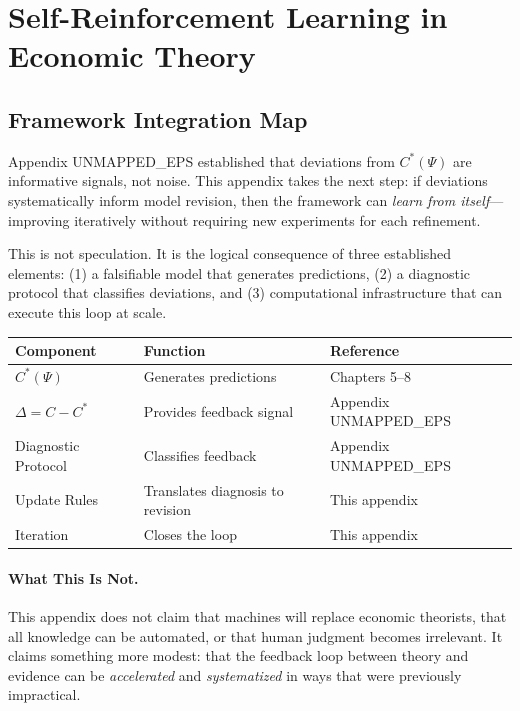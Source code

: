 \section{Self-Reinforcement Learning in Economic Theory}
\label{app:self-reinforcement}

\subsection{Framework Integration Map}

Appendix UNMAPPED_EPS established that deviations from $C^*(\Psi)$ are informative signals, 
not noise. This appendix takes the next step: if deviations systematically 
inform model revision, then the framework can \emph{learn from itself}---improving 
iteratively without requiring new experiments for each refinement.

This is not speculation. It is the logical consequence of three established 
elements: (1) a falsifiable model that generates predictions, (2) a diagnostic 
protocol that classifies deviations, and (3) computational infrastructure that 
can execute this loop at scale.

\begin{center}
\renewcommand{\arraystretch}{1.4}
\begin{tabular}{|l|l|l|}
\hline
\textbf{Component} & \textbf{Function} & \textbf{Reference} \\
\hline
$C^*(\Psi)$ & Generates predictions & Chapters 5--8 \\
$\Delta = C - C^*$ & Provides feedback signal & Appendix UNMAPPED_EPS \\
Diagnostic Protocol & Classifies feedback & Appendix UNMAPPED_EPS \\
Update Rules & Translates diagnosis to revision & This appendix \\
Iteration & Closes the loop & This appendix \\
\hline
\end{tabular}
\end{center}

\paragraph{What This Is Not.}
This appendix does not claim that machines will replace economic theorists, 
that all knowledge can be automated, or that human judgment becomes irrelevant. 
It claims something more modest: that the feedback loop between theory and 
evidence can be \emph{accelerated} and \emph{systematized} in ways that were 
previously impractical.


